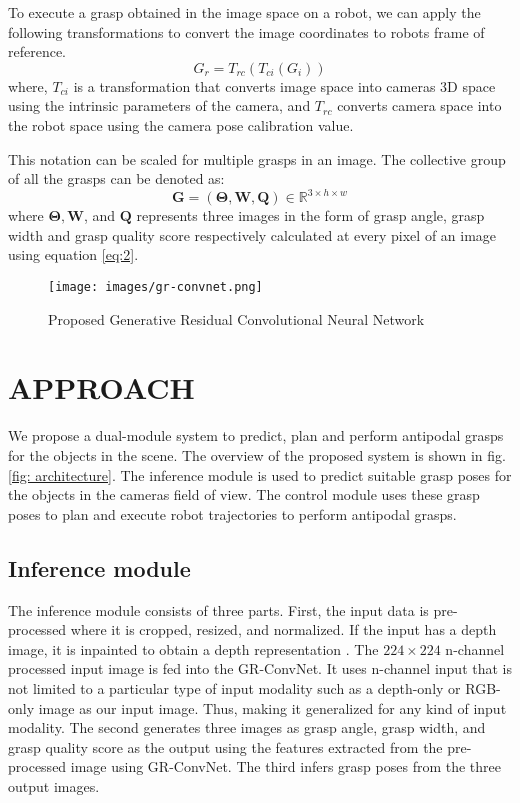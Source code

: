 \documentclass[letterpaper, 10pt, conference]{IEEEtran}
\begin{document}
To execute a grasp obtained in the image space on a robot, we can apply the following transformations to convert the image coordinates to robot\textquotesingle s frame of reference.
\begin{equation}
    G_r = T_{rc}(T_{ci}(G_i))
\end{equation}
where, $T_{ci}$ is a transformation that converts image space into camera\textquotesingle s 3D space using the intrinsic parameters of the camera, and $T_{rc}$ converts camera space into the robot space using the camera pose calibration value. 

This notation can be scaled for multiple grasps in an image. The collective group of all the grasps can be denoted as:
\begin{equation}
    \textbf{G} = (\bm{\Theta},\textbf{W},\textbf{Q}) \in \mathbb{R}^{3\times h \times w}
\end{equation}
where $\bm{\Theta},\textbf{W}$, and $\textbf{Q}$ represents three images in the form of grasp angle, grasp width and grasp quality score respectively calculated at every pixel of an image using equation \eqref{eq:2}. 



\begin{figure*}
    \centering
    \vspace*{0.2cm}
    \texttt{[image: images/gr-convnet.png]}
    \caption{Proposed Generative Residual Convolutional Neural Network}
    \label{fig: network}
\end{figure*}

\section{APPROACH}


We propose a dual-module system to predict, plan and perform antipodal grasps for the objects in the scene. The overview of the proposed system is shown in fig.\ref{fig: architecture}. The inference module is used to predict suitable grasp poses for the objects in the camera\textquotesingle s field of view. The control module uses these grasp poses to plan and execute robot trajectories to perform antipodal grasps.

\subsection{Inference module}
The inference module consists of three parts. First, the input data is pre-processed where it is cropped, resized, and normalized. If the input has a depth image, it is inpainted to obtain a depth representation \cite{xue2017depth}. The $224\times224$ n-channel processed input image is fed into the GR-ConvNet. It uses n-channel input that is not limited to a particular type of input modality such as a depth-only or RGB-only image as our input image. Thus, making it generalized for any kind of input modality. The second generates three images as grasp angle, grasp width, and grasp quality score as the output using the features extracted from the pre-processed image using GR-ConvNet. The third infers grasp poses from the three output images.
\end{document}
